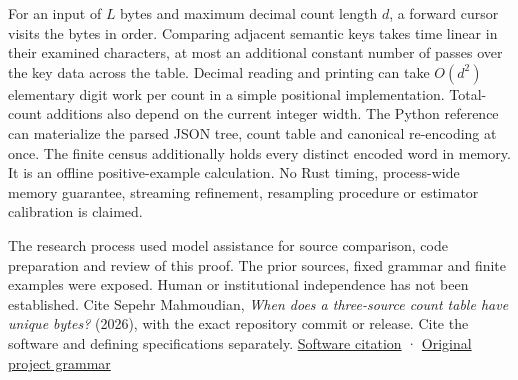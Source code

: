 \documentclass[11pt,a4paper]{article}
\begin{document}
For an input of \(L\) bytes and maximum decimal count length \(d\), a forward cursor visits the bytes in order. Comparing adjacent semantic keys takes time linear in their examined characters, at most an additional constant number of passes over the key data across the table. Decimal reading and printing can take \(O(d^2)\) elementary digit work per count in a simple positional implementation. Total-count additions also depend on the current integer width. The Python reference can materialize the parsed JSON tree, count table and canonical re-encoding at once. The finite census additionally holds every distinct encoded word in memory. It is an offline positive-example calculation. No Rust timing, process-wide memory guarantee, streaming refinement, resampling procedure or estimator calibration is claimed.

The research process used model assistance for source comparison, code preparation and review of this proof. The prior sources, fixed grammar and finite examples were exposed. Human or institutional independence has not been established. Cite Sepehr Mahmoudian, \emph{When does a three-source count table have unique bytes?} (2026), with the exact repository commit or release. Cite the software and defining specifications separately. \href{https://github.com/sepahead/pid-rs/blob/1479fc5e0ca15e5ef9c5521f8bc7aa36f2a98d20/CITATION.cff}{Software citation} · \href{https://github.com/sepahead/pid-rs/blob/1479fc5e0ca15e5ef9c5521f8bc7aa36f2a98d20/claims/SX-CERTIFIED-AVERAGED-PID3-001/bindings.md}{Original project grammar}
\end{document}
